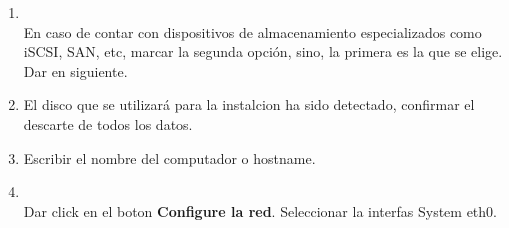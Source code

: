 \documentclass[11pt]{article}
\begin{document}
\begin{enumerate}
			\item 
				\begin{minipage}[t]{\linewidth}
			          \raggedright
			          \medskip
			          \\En caso de contar con dispositivos de almacenamiento especializados como iSCSI, SAN, etc, marcar la segunda opción, sino, la primera es la que se elige. Dar en siguiente.
			    \end{minipage}			

			\item El disco que se utilizará para la instalcion ha sido detectado, confirmar el descarte de todos los datos.
			\item Escribir el nombre del computador o hostname.
			\item 				
				\begin{minipage}[t]{\linewidth}
			          \raggedright
			          \medskip
			          \\Dar click en el boton \textbf{Configure la red}. Seleccionar la interfas System eth0.
			    \end{minipage}	


\end{enumerate}
\end{document}
